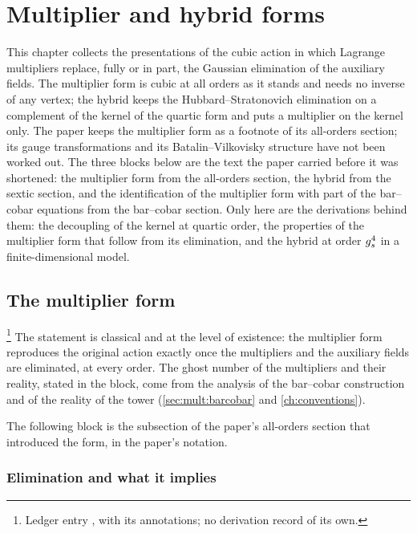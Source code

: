 \section{Multiplier and hybrid forms}
\label{ch:multiplier-hybrid}

This chapter collects the presentations of the cubic action in which Lagrange multipliers replace, fully or in part, the Gaussian elimination of the auxiliary fields.
The multiplier form is cubic at all orders as it stands and needs no inverse of any vertex; the hybrid keeps the Hubbard--Stratonovich elimination on a complement of the kernel of the quartic form and puts a multiplier on the kernel only.
The paper keeps the multiplier form as a footnote of its all-orders section; its gauge transformations and its Batalin--Vilkovisky structure have not been worked out.
The three blocks below are the text the paper carried before it was shortened: the multiplier form from the all-orders section, the hybrid from the sextic section, and the identification of the multiplier form with part of the bar--cobar equations from the bar--cobar section.
Only here are the derivations behind them: the decoupling of the kernel at quartic order, the properties of the multiplier form that follow from its elimination, and the hybrid at order $g_s^4$ in a finite-dimensional model.

\subsection{The multiplier form}
\label{sec:mult:form}

\footnote{Ledger entry , with its annotations; no derivation record of its own.}
The statement is classical and at the level of existence: the multiplier form reproduces the original action exactly once the multipliers and the auxiliary fields are eliminated, at every order.
The ghost number of the multipliers and their reality, stated in the block, come from the analysis of the bar--cobar construction and of the reality of the tower (\cref{sec:mult:barcobar} and \cref{ch:conventions}).

The following block is the subsection of the paper's all-orders section that introduced the form, in the paper's notation.



\subsubsection{Elimination and what it implies}
\label{sec:mult:elimination}

